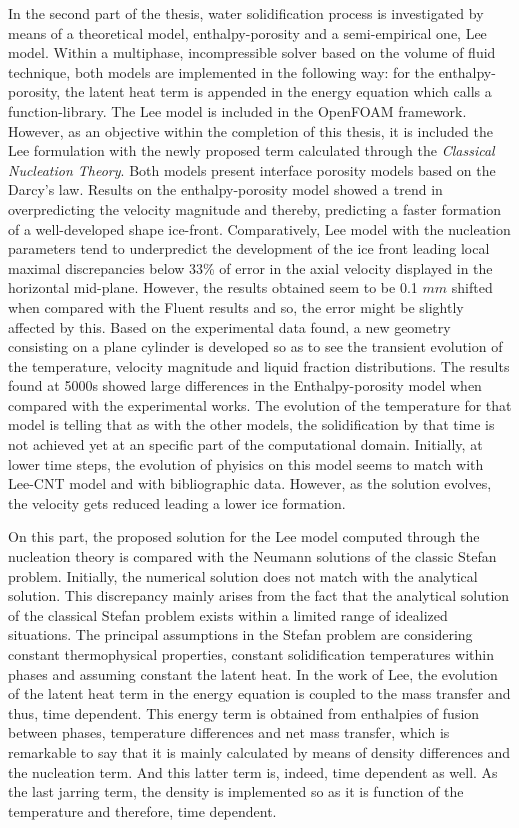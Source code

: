 \noindent In the second part of the thesis, water solidification process is investigated by means of a theoretical model, enthalpy-porosity and a semi-empirical one, Lee model. Within a multiphase, incompressible solver based on the volume of fluid technique, both models are implemented in the following way: for the enthalpy-porosity, the latent heat term is appended in the energy equation which calls a function-library. The Lee model is included in the OpenFOAM framework. However, as an objective within the completion of this thesis, it is included the Lee formulation with the newly proposed term calculated through the \textit{Classical Nucleation Theory}. Both models present interface porosity models based on the Darcy's law. Results on the enthalpy-porosity model showed a trend in overpredicting the velocity magnitude and thereby, predicting a faster formation of a well-developed shape ice-front. Comparatively, Lee model with the nucleation parameters tend to underpredict the development of the ice front leading local maximal discrepancies below 33\% of error in the axial velocity displayed in the horizontal mid-plane. However, the results obtained seem to be 0.1 $mm$ shifted when compared with the Fluent results and so, the error might be slightly affected by this. Based on the experimental data found, a new geometry consisting on a plane cylinder is developed so as to see the transient evolution of the temperature, velocity magnitude and liquid fraction distributions. The results found at 5000s showed large differences in the Enthalpy-porosity model when compared with the experimental works. The evolution of the temperature for that model is telling that as with the other models, the solidification by that time is not achieved yet at an specific part of the computational domain. Initially, at lower time steps, the evolution of phyisics on this model seems to match with Lee-CNT model and with bibliographic data. However, as the solution evolves, the velocity gets reduced leading a lower ice formation. 

\noindent On this part, the proposed solution for the Lee model computed through the nucleation theory is compared with the Neumann solutions of the classic Stefan problem. Initially, the numerical solution does not match with the analytical solution. This discrepancy mainly arises from the fact that the analytical solution of the classical Stefan problem exists within a limited range of idealized situations. The principal assumptions in the Stefan problem are considering constant thermophysical properties, constant solidification temperatures within phases and assuming constant the latent heat. In the work of Lee, the evolution of the latent heat term in the energy equation is coupled to the mass transfer and thus, time dependent. This energy term is obtained from enthalpies of fusion between phases, temperature differences and net mass transfer, which is remarkable to say that it is mainly calculated by means of density differences and the nucleation term. And this latter term is, indeed, time dependent as well. As the last jarring term, the density is implemented so as it is function of the temperature and therefore, time dependent.

